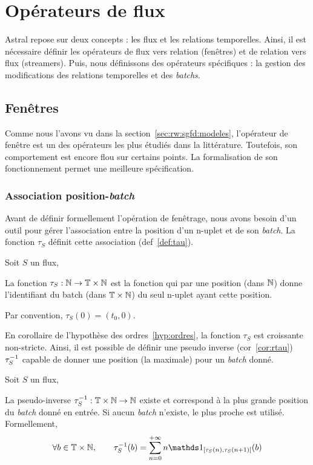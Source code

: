 \section{Opérateurs de flux}\label{sec:contrib:astral:flux}
Astral repose sur deux concepts : les flux et les relations temporelles. Ainsi, il est nécessaire définir les opérateurs de flux vers relation (fenêtres) et de relation vers flux (streamers). Puis, nous définissons des opérateurs spécifiques : la gestion des modifications des relations temporelles et des \textit{batchs}.
\subsection{Fenêtres}
Comme nous l'avons vu dans la section~\ref{sec:rw:sgfd:modeles}, l'opérateur de fenêtre est un des opérateurs les plus étudiés dans la littérature. Toutefois, son comportement est encore flou sur certains points. La formalisation de son fonctionnement permet une meilleure spécification.
\subsubsection{Association position-\textit{batch}}
Avant de définir formellement l'opération de fenêtrage, nous avons besoin d'un outil pour gérer l'association entre la position d'un n-uplet et de son \textit{batch}. La fonction $\tau_S$ définit cette association (def~\ref{def:tau}). 
\begin{defi}\label{def:tau}
    Soit $S$ un flux,

    La fonction $\tau_S : \mathbb{N}\to \mathbb{T}\times\mathbb{N}$ est la fonction qui par une position (dans $\mathbb{N}$) donne l'identifiant du batch (dans $\mathbb{T}\times\mathbb{N}$) du seul n-uplet ayant cette position.

    Par convention, $\tau_S(0)=(t_0,0)$.
\end{defi}

En corollaire de l'hypothèse des ordres~\ref{hyp:ordres}, la fonction $\tau_S$ est croissante non-stricte. Ainsi, il est possible de définir une pseudo inverse (cor~\ref{cor:rtau}) $\tau^{-1}_S$ capable de donner une position (la maximale) pour un \textit{batch} donné.
\begin{coro}\label{cor:rtau}
    Soit $S$ un flux,

    La pseudo-inverse $\tau^{-1}_S:\mathbb{T}\times\mathbb{N}\to \mathbb{N}$ existe et correspond à la plus grande position du \textit{batch} donné en entrée. Si aucun \textit{batch} n'existe, le plus proche est utilisé. Formellement, $$\forall b \in \TN, \qquad \tau_S^{-1}(b) = \sum_{n=0}^{+\infty} n \indic_{[\tau_S(n),\tau_S(n+1)[}(b)$$
\end{coro}

